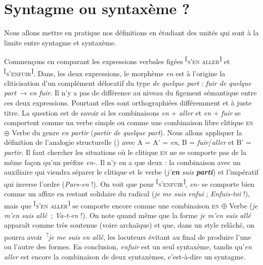 \section{Syntagme ou syntaxème ?}\label{sec:3.1.4}

Nous allons mettre en pratique nos définitions en étudiant des unités qui sont à la limite entre syntagme et syntaxème.

Commençons en comparant les expressions verbales figées \textsuperscript{⌈}\textsc{s’en} \textsc{aller}\textsuperscript{⌉} et \textsuperscript{⌈}\textsc{s’enfuir}\textsuperscript{⌉}. Dans, les deux expressions, le morphème \textit{en} est à l’origine la cliticisation d’un complément délocatif du type \textit{de quelque part} : \textit{fuir de quelque part~}→ \textit{en fuir}. Il n’y a pas de différence au niveau du figement sémantique entre ces deux expressions. Pourtant elles sont orthographiées différemment et à juste titre. La question est de savoir si les combinaisons \textit{en} + \textit{aller} et \textit{en} + \textit{fuir} se comportent comme un verbe simple ou comme une combinaison libre clitique \textsc{en} ${\oplus}$ Verbe du genre \textit{en partir} (\textit{partir de quelque part}). Nous allons appliquer la définition de l’analogie structurelle () avec A = A’ = \textit{en}, B = \textit{fuir}/\textit{aller} et B’ = \textit{partir}. Il faut chercher les situations où le clitique \textsc{en} ne se comporte pas de la même façon qu’un préfixe \textit{en-}. Il n’y en a que deux : la combinaison avec un auxiliaire qui viendra séparer le clitique et le verbe (\textit{j’}\textbf{\textit{en}} \textit{suis} \textbf{\textit{parti}}) et l’impératif qui inverse l’ordre (\textit{Pars-en} !). On voit que pour \textsuperscript{⌈}\textsc{s’enfuir}\textsuperscript{⌉}, \textit{en-} se comporte bien comme un affixe en restant solidaire du radical (\textit{je me suis enfui} ; \textit{Enfuis-toi} !), mais que \textsuperscript{⌈}\textsc{s’en} \textsc{aller}\textsuperscript{⌉} se comporte encore comme une combinaison \textsc{en} ${\oplus}$ Verbe (\textit{je m’en suis allé~}; \textit{Va-t-en} !). On note quand même que la forme \textit{je m’en suis allé} apparaît comme très soutenue (voire archaïque) et que, dans un style relâché, on pourra avoir~\textsuperscript{?}\textit{je me suis en allé}, les locuteurs évitant au final de produire l’une ou l’autre des formes. En conclusion, \textit{enfuir} est un seul syntaxème, tandis qu’\textit{en aller} est encore la combinaison de deux syntaxèmes, c’est-à-dire un syntagme.

